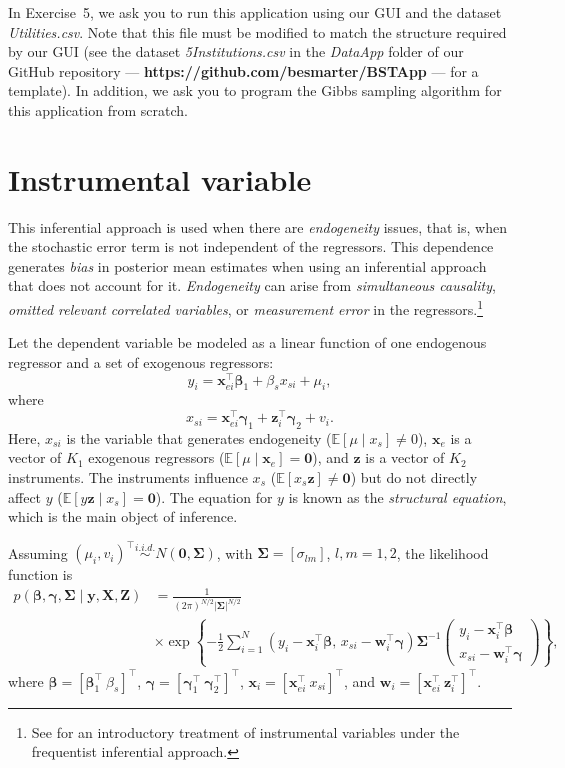 In Exercise~5, we ask you to run this application using our GUI and the dataset \textit{Utilities.csv}. Note that this file must be modified to match the structure required by our GUI (see the dataset \textit{5Institutions.csv} in the \textit{DataApp} folder of our GitHub repository — \textbf{https://github.com/besmarter/BSTApp} — for a template). In addition, we ask you to program the Gibbs sampling algorithm for this application from scratch.

\section{Instrumental variable}\label{sec73}

This inferential approach is used when there are \textit{endogeneity} issues, that is, when the stochastic error term is not independent of the regressors. This dependence generates \textit{bias} in posterior mean estimates when using an inferential approach that does not account for it. \textit{Endogeneity} can arise from \textit{simultaneous causality}, \textit{omitted relevant correlated variables}, or \textit{measurement error} in the regressors.\footnote{See \cite[Chap.~15]{wooldridge2016introductory} for an introductory treatment of instrumental variables under the frequentist inferential approach.}

Let the dependent variable be modeled as a linear function of one endogenous regressor and a set of exogenous regressors:
\[
y_{i} = \bm{x}_{ei}^{\top}\bm{\beta}_1 + \beta_s x_{si} + \mu_{i},
\]
where
\[
x_{si} = \bm{x}_{ei}^{\top}\bm{\gamma}_1 + \bm{z}_i^{\top}\bm{\gamma}_2 + v_{i}.
\]
Here, \(x_{si}\) is the variable that generates endogeneity (\(\mathbb{E}[\mu \mid x_s] \neq 0\)), \(\bm{x}_e\) is a vector of \(K_1\) exogenous regressors (\(\mathbb{E}[\mu \mid \bm{x}_e] = \bm{0}\)), and \(\bm{z}\) is a vector of \(K_2\) instruments. The instruments influence \(x_s\) (\(\mathbb{E}[x_s \bm{z}] \neq \bm{0}\)) but do not directly affect \(y\) (\(\mathbb{E}[y \bm{z} \mid x_s] = \bm{0}\)). The equation for \(y\) is known as the \textit{structural equation}, which is the main object of inference.

Assuming $(\mu_i, v_i)^{\top} \stackrel{i.i.d.}{\sim} N(\bm{0}, \bm{\Sigma})$, with $\bm{\Sigma} = [\sigma_{lm}]$, $l,m = 1,2$, the likelihood function is
\begin{align*}
	p(\bm{\beta}, \bm{\gamma}, \bm{\Sigma} \mid \bm{y}, \bm{X}, \bm{Z}) 
	&= \frac{1}{(2\pi)^{N/2} |\bm{\Sigma}|^{N/2}}\\
	&\times
	\exp\left\{
	-\frac{1}{2} \sum_{i=1}^N 
	(y_i - \bm{x}_i^{\top}\bm{\beta},\, x_{si} - \bm{w}_i^{\top}\bm{\gamma})
	\bm{\Sigma}^{-1}
	\begin{pmatrix}
		y_i - \bm{x}_i^{\top}\bm{\beta} \\
		x_{si} - \bm{w}_i^{\top}\bm{\gamma}
	\end{pmatrix}
	\right\},
\end{align*}
where $\bm{\beta} = [\bm{\beta}_1^{\top} \ \beta_s]^{\top}$, $\bm{\gamma} = [\bm{\gamma}_1^{\top} \ \bm{\gamma}_2^{\top}]^{\top}$, $\bm{x}_i = [\bm{x}_{ei}^{\top} \ x_{si}]^{\top}$, and $\bm{w}_i = [\bm{x}_{ei}^{\top} \ \bm{z}_{i}^{\top}]^{\top}$.

